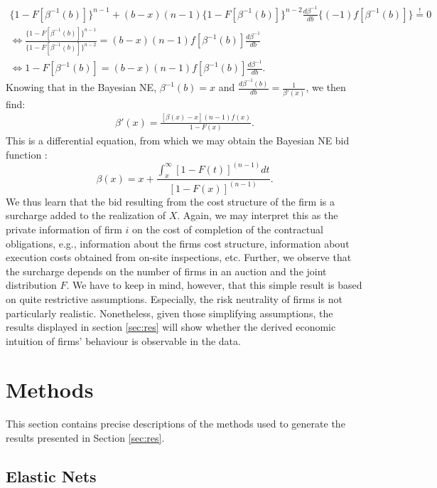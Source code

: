 \documentclass[a4paper,12pt, headsepline]{scrartcl}
\numberwithin{equation}{section}
\begin{document}
\begin{gather*}
\{1-F[\beta^{-1}(b)]\}^{n-1} + (b - x)(n - 		1)\{1-F[\beta^{-1}(b)]\}^{n-2}\frac{d\beta^{-1}}{db}\{(-1)f[\beta^{-1}(b)]\} \overset{!}{=} 0\\
	\iff \frac{\{1-F[\beta^{-1}(b)]\}^{n-1}}{\{1-F[\beta^{-1}(b)]\}^{n-2}} = (b - x)(n - 1)f[\beta^{-1}(b)]\frac{d\beta^{-1}}{db}\\
	\iff 1-F[\beta^{-1}(b)] = (b - x)(n - 1)f[\beta^{-1}(b)]\frac{d\beta^{-1}}{db}.
\end{gather*}
Knowing that in the Bayesian NE, $\beta^{-1}(b) = x$ and $\frac{d\beta^{-1}(b)}{db} = \frac{1}{\beta'(x)}$, we then find:
\begin{gather*}
	\beta'(x) = \frac{[\beta(x) - x](n - 1)f(x)}{1-F(x)}.
\end{gather*}
This is a differential equation, from which we may obtain the Bayesian NE bid function \citep{decarolis18}:
\[
\beta(x) = x + \frac{\int_x^\infty [1 - F(t)]^{(n-1)}dt}{[1-F(x)]^{(n-1)}}.
\]
We thus learn that the bid resulting from the cost structure of the firm is a surcharge added to the realization of $X$. Again, we may interpret this as the private information of firm $i$ on the cost of completion of the contractual obligations, e.g., information about the firms cost structure, information about execution costs obtained from on-site inspections, etc. Further, we observe that the surcharge depends on the number of firms in an auction and the joint distribution $F$. We have to keep in mind, however, that this simple result is based on quite restrictive assumptions. Especially, the risk neutrality of firms is not particularly realistic. Nonetheless, given those simplifying assumptions, the results displayed in section \ref{sec:res} will show whether the derived economic intuition of firms' behaviour is observable in the data.
\newpage
\section{Methods}\label{sec:meth}

This section contains precise descriptions of the methods used to generate the results presented in Section \ref{sec:res}.

\subsection{Elastic Nets}\label{subsec:net}
\end{document}
